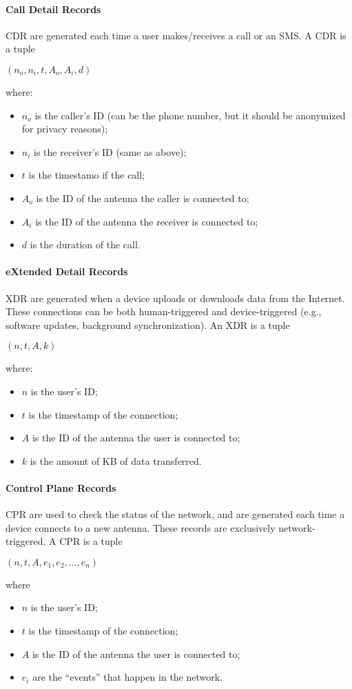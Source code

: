 \paragraph{Call Detail Records} CDR are generated each time a user makes/receives a call or an SMS. A CDR is a tuple
\begin{center}
$(n_o, n_i, t, A_o, A_i, d)$
\end{center}
where:
\begin{itemize}[itemsep=-5pt, label=-]
    \item $n_o$ is the caller's ID (can be the phone number, but it should be anonymized for privacy reasons);
    \item $n_i$ is the receiver's ID (same as above);
    \item $t$ is the timestamo if the call;
    \item $A_o$ is the ID of the antenna the caller is connected to;
    \item $A_i$ is the ID of the antenna the receiver is connected to;
    \item $d$ is the duration of the call.
\end{itemize}

\paragraph{eXtended Detail Records}
XDR are generated when a device uploads or downloads data from the Internet. These connections can be both human-triggered and device-triggered (e.g., software updates, background synchronization). An XDR is a tuple
\begin{center}
$(n, t, A, k)$
\end{center}
where:
\begin{itemize}[itemsep=-5pt, label=-]
    \item $n$ is the user's ID;
    \item $t$ is the timestamp of the connection;
    \item $A$ is the ID of the antenna the user is connected to;
    \item $k$ is the amount of KB of data transferred.
\end{itemize}

\paragraph{Control Plane Records}
CPR are used to check the status of the network, and are generated each time a device connects to a new antenna. These records are exclusively network-triggered. A CPR is a tuple
\begin{center}
    $(n, t, A, e_1, e_2, \dots, e_n)$
\end{center}
where
\begin{itemize}[itemsep=-5pt, label=-]
    \item $n$ is the user's ID;
    \item $t$ is the timestamp of the connection;
    \item $A$ is the ID of the antenna the user is connected to;
    \item $e_i$ are the ``events'' that happen in the network.
\end{itemize}

